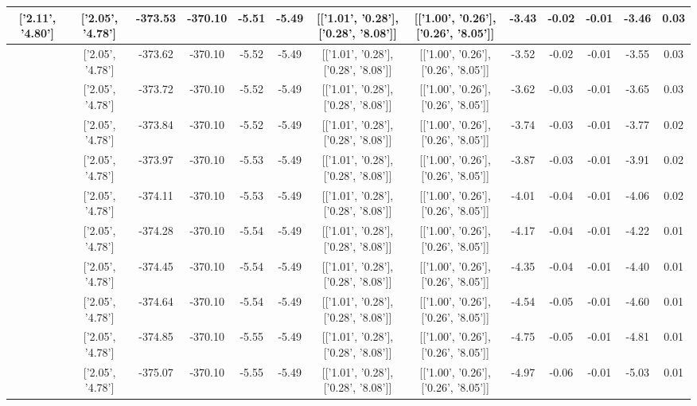 \begin{table}[htbp]
\begin{adjustbox}{angle=90}
\begin{tabular}{|c|c|c|c|c|c|c|c|c|c|c|c|c|}
 ['2.11', '4.80'] & ['2.05', '4.78'] & -373.53 & -370.10 & -5.51 & -5.49 & [['1.01', '0.28'], ['0.28', '8.08']] & [['1.00', '0.26'], ['0.26', '8.05']] & -3.43 & -0.02 & -0.01 & -3.46 & 0.03\\ \hline
 ['2.12', '4.80'] & ['2.05', '4.78'] & -373.62 & -370.10 & -5.52 & -5.49 & [['1.01', '0.28'], ['0.28', '8.08']] & [['1.00', '0.26'], ['0.26', '8.05']] & -3.52 & -0.02 & -0.01 & -3.55 & 0.03\\ \hline
 ['2.14', '4.80'] & ['2.05', '4.78'] & -373.72 & -370.10 & -5.52 & -5.49 & [['1.01', '0.28'], ['0.28', '8.08']] & [['1.00', '0.26'], ['0.26', '8.05']] & -3.62 & -0.03 & -0.01 & -3.65 & 0.03\\ \hline
 ['2.15', '4.80'] & ['2.05', '4.78'] & -373.84 & -370.10 & -5.52 & -5.49 & [['1.01', '0.28'], ['0.28', '8.08']] & [['1.00', '0.26'], ['0.26', '8.05']] & -3.74 & -0.03 & -0.01 & -3.77 & 0.02\\ \hline
 ['2.16', '4.81'] & ['2.05', '4.78'] & -373.97 & -370.10 & -5.53 & -5.49 & [['1.01', '0.28'], ['0.28', '8.08']] & [['1.00', '0.26'], ['0.26', '8.05']] & -3.87 & -0.03 & -0.01 & -3.91 & 0.02\\ \hline
 ['2.17', '4.81'] & ['2.05', '4.78'] & -374.11 & -370.10 & -5.53 & -5.49 & [['1.01', '0.28'], ['0.28', '8.08']] & [['1.00', '0.26'], ['0.26', '8.05']] & -4.01 & -0.04 & -0.01 & -4.06 & 0.02\\ \hline
 ['2.18', '4.81'] & ['2.05', '4.78'] & -374.28 & -370.10 & -5.54 & -5.49 & [['1.01', '0.28'], ['0.28', '8.08']] & [['1.00', '0.26'], ['0.26', '8.05']] & -4.17 & -0.04 & -0.01 & -4.22 & 0.01\\ \hline
 ['2.19', '4.81'] & ['2.05', '4.78'] & -374.45 & -370.10 & -5.54 & -5.49 & [['1.01', '0.28'], ['0.28', '8.08']] & [['1.00', '0.26'], ['0.26', '8.05']] & -4.35 & -0.04 & -0.01 & -4.40 & 0.01\\ \hline
 ['2.21', '4.81'] & ['2.05', '4.78'] & -374.64 & -370.10 & -5.54 & -5.49 & [['1.01', '0.28'], ['0.28', '8.08']] & [['1.00', '0.26'], ['0.26', '8.05']] & -4.54 & -0.05 & -0.01 & -4.60 & 0.01\\ \hline
 ['2.22', '4.82'] & ['2.05', '4.78'] & -374.85 & -370.10 & -5.55 & -5.49 & [['1.01', '0.28'], ['0.28', '8.08']] & [['1.00', '0.26'], ['0.26', '8.05']] & -4.75 & -0.05 & -0.01 & -4.81 & 0.01\\ \hline
 ['2.23', '4.82'] & ['2.05', '4.78'] & -375.07 & -370.10 & -5.55 & -5.49 & [['1.01', '0.28'], ['0.28', '8.08']] & [['1.00', '0.26'], ['0.26', '8.05']] & -4.97 & -0.06 & -0.01 & -5.03 & 0.01\\ \hline

\end{tabular}
\end{adjustbox}
\end{table}
